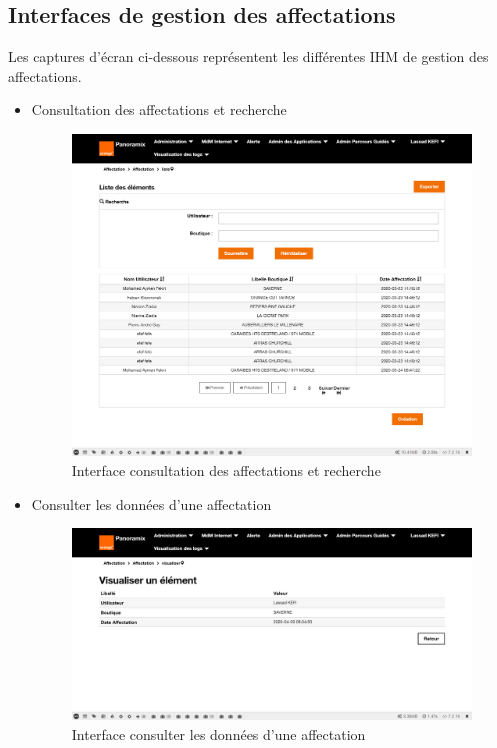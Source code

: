 \subsection{Interfaces de gestion des affectations}
Les captures d'écran ci-dessous représentent les différentes IHM de gestion des affectations.
\begin{itemize}
	\item Consultation des affectations et recherche
	\begin{figure}[H]
		\centering
		\includegraphics[width=0.6\linewidth]{"img/screenshots/affectation users-boutique/index"}
		\caption[Interface consultation des affectations et recherche]{Interface consultation des affectations et recherche}
		\label{fig:index-affectation}
	\end{figure}
	
	\item Consulter les données d'une affectation
	\begin{figure}[H]
		\centering
		\includegraphics[width=0.6\linewidth]{"img/screenshots/affectation users-boutique/view"}
		\caption[Interface voir une affectation]{Interface consulter les données d'une affectation}
		\label{fig:view-affectation}
	\end{figure}


\end{itemize}
